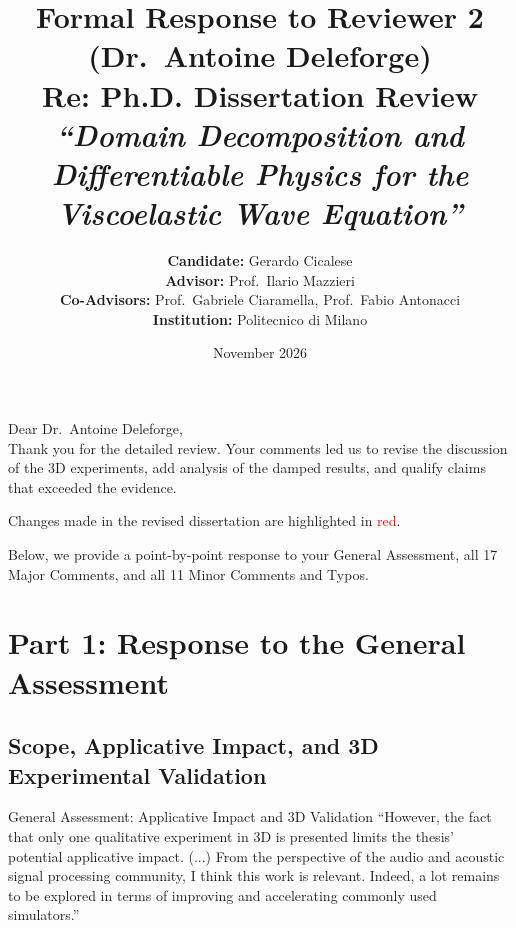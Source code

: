 \documentclass[11pt,a4paper]{article}
\begin{document}
\title{\textbf{\Large Formal Response to Reviewer 2 (Dr.~Antoine Deleforge)}\\[0.3em]
\large Re: Ph.D. Dissertation Review\\\emph{``Domain Decomposition and Differentiable Physics for the Viscoelastic Wave Equation''}}
\author{\textbf{Candidate:} Gerardo Cicalese\\[0.3em]
\textbf{Advisor:} Prof.~Ilario Mazzieri\\[0.3em]
\textbf{Co-Advisors:} Prof.~Gabriele Ciaramella, Prof.~Fabio Antonacci\\[0.3em]
\textbf{Institution:} Politecnico di Milano}
\date{November 2026}
\maketitle

\noindent Dear Dr.~Antoine Deleforge,\\[0.5em]
Thank you for the detailed review. Your comments led us to revise the discussion of the 3D experiments, add analysis of the damped results, and qualify claims that exceeded the evidence.

Changes made in the revised dissertation are highlighted in \textcolor{red}{red}.

Below, we provide a point-by-point response to your General Assessment, all 17 Major Comments, and all 11 Minor Comments and Typos.

\tableofcontents
\newpage

\section{Part 1: Response to the General Assessment}

\subsection{Scope, Applicative Impact, and 3D Experimental Validation}
\begin{revcomment}{General Assessment: Applicative Impact and 3D Validation}
``However, the fact that only one qualitative experiment in 3D is presented limits the thesis' potential applicative impact. (...) From the perspective of the audio and acoustic signal processing community, I think this work is relevant. Indeed, a lot remains to be explored in terms of improving and accelerating commonly used simulators.''
\end{revcomment}
\end{document}

